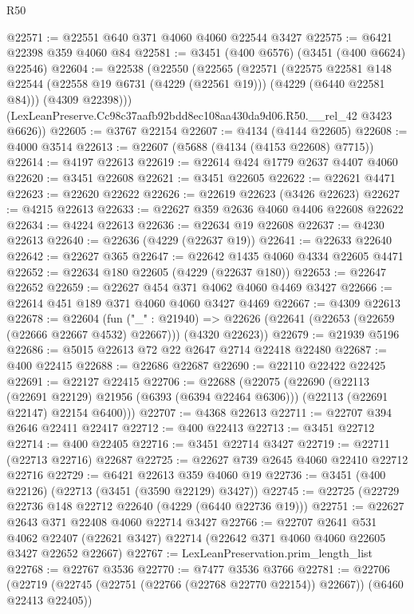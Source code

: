 \begin{lexlean}{R50}
\begin{coremodule}
@22571 := @22551 @640 @371 @4060 @4060 @22544 @3427
@22575 := @6421 @22398 @359 @4060 @84
@22581 := @3451 (@400 @6576) (@3451 (@400 @6624) @22546)
@22604 := @22538
    (@22550
      (@22565
        (@22571
          (@22575
            @22581
            @148
            @22544
            (@22558 @19 @6731 (@4229 (@22561 @19)))
            (@4229 (@6440 @22581 @84)))
          (@4309 @22398)))
      (LexLeanPreserve.Cc98c37aafb92bdd8ec108aa430da9d06.R50.__rel_42 @3423 @6626))
@22605 := @3767 @22154
@22607 := @4134 (@4144 @22605)
@22608 := @4000 @3514
@22613 := @22607 (@5688 (@4134 (@4153 @22608) @7715))
@22614 := @4197 @22613
@22619 := @22614 @424 @1779 @2637 @4407 @4060
@22620 := @3451 @22608
@22621 := @3451 @22605
@22622 := @22621 @4471
@22623 := @22620 @22622
@22626 := @22619 @22623 (@3426 @22623)
@22627 := @4215 @22613
@22633 := @22627 @359 @2636 @4060 @4406 @22608 @22622
@22634 := @4224 @22613
@22636 := @22634 @19 @22608
@22637 := @4230 @22613
@22640 := @22636 (@4229 (@22637 @19))
@22641 := @22633 @22640
@22642 := @22627 @365
@22647 := @22642 @1435 @4060 @4334 @22605 @4471
@22652 := @22634 @180 @22605 (@4229 (@22637 @180))
@22653 := @22647 @22652
@22659 := @22627 @454 @371 @4062 @4060 @4469 @3427
@22666 := @22614 @451 @189 @371 @4060 @4060 @3427 @4469
@22667 := @4309 @22613
@22678 := @22604
    (fun ("_" : @21940) =>
    @22626 (@22641 (@22653 (@22659 (@22666 @22667 @4532) @22667))) (@4320 @22623))
@22679 := @21939 @5196
@22686 := @5015 @22613 @72 @22 @2647 @2714 @22418 @22480
@22687 := @400 @22415
@22688 := @22686 @22687
@22690 := @22110 @22422 @22425
@22691 := @22127 @22415
@22706 := @22688
    (@22075
      (@22690
        (@22113 (@22691 @22129) @21956 (@6393 (@6394 @22464 @6306)))
        (@22113 (@22691 @22147) @22154 @6400)))
@22707 := @4368 @22613
@22711 := @22707 @394 @2646 @22411 @22417
@22712 := @400 @22413
@22713 := @3451 @22712
@22714 := @400 @22405
@22716 := @3451 @22714 @3427
@22719 := @22711 (@22713 @22716) @22687
@22725 := @22627 @739 @2645 @4060 @22410 @22712 @22716
@22729 := @6421 @22613 @359 @4060 @19
@22736 := @3451 (@400 @22126) (@22713 (@3451 (@3590 @22129) @3427))
@22745 := @22725 (@22729 @22736 @148 @22712 @22640 (@4229 (@6440 @22736 @19)))
@22751 := @22627 @2643 @371 @22408 @4060 @22714 @3427
@22766 := @22707
    @2641
    @531
    @4062
    @22407
    (@22621 @3427)
    @22714
    (@22642 @371 @4060 @4060 @22605 @3427 @22652 @22667)
@22767 := LexLeanPreservation.prim_length_list
@22768 := @22767 @3536
@22770 := @7477 @3536 @3766
@22781 := @22706
    (@22719 (@22745 (@22751 (@22766 (@22768 @22770 @22154)) @22667)) (@6460 @22413 @22405))

\end{coremodule}
\end{lexlean}
